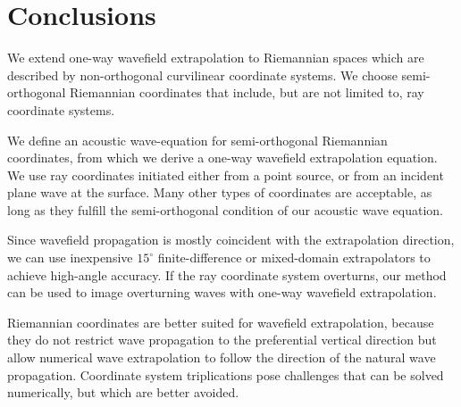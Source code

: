 \section{Conclusions}
We extend one-way wavefield extrapolation to 
Riemannian spaces which are described by
non-orthogonal curvilinear coordinate systems.
We choose semi-orthogonal Riemannian coordinates
that include, but are not limited to,
ray coordinate systems.
\par
We define an acoustic wave-equation for 
semi-orthogonal Riemannian coordinates, from which we derive
a one-way wavefield extrapolation equation.
We use ray coordinates initiated either from a point
source, or from an incident plane wave at the surface.
Many other types of coordinates are acceptable, as long
as they fulfill the semi-orthogonal condition of our
acoustic wave equation.
\par
Since wavefield propagation is mostly coincident with the
extrapolation direction, we can use inexpensive
$15^\circ$ finite-difference or mixed-domain 
extrapolators to achieve high-angle accuracy.
If the ray coordinate system overturns, our 
method can be used to image overturning waves 
with one-way wavefield extrapolation.
\par
Riemannian coordinates are better suited for
wavefield extrapolation, because they do not restrict 
wave propagation to the preferential vertical direction but allow 
numerical wave extrapolation to follow the direction of the natural 
wave  propagation. 
Coordinate system triplications pose challenges that can
be solved numerically, but which are better avoided.
